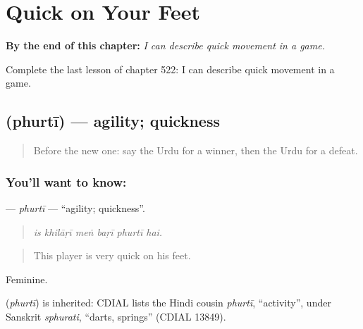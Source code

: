 
\chapter{Quick on Your Feet}
\label{ch:ur-quick-on-your-feet}

\begin{chapteropening}
\textbf{By the end of this chapter:} \emph{I can describe quick movement in a game.}

Complete the last lesson of chapter 522: I can describe quick movement in a game.
\end{chapteropening}

\section[\texorpdfstring{\ur{پھرتی} (phurtī)}{پھرتی (phurtī)}]{ (phurtī) — agility; quickness}

\label{lesson:UR-C522-phurti}



\begin{quote}
Before the new one: say the Urdu for a winner, then the Urdu for a defeat.
\end{quote}

\subsection*{You'll want to know: }
\textbf{} — \emph{phurtī} — \textquotedblleft{}agility; quickness\textquotedblright{}.

\begin{quote}
     
\end{quote}

\begin{quote}
\emph{is khilāṛī meṅ baṛī phurtī hai.}
\end{quote}

\begin{quote}
This player is very quick on his feet.
\end{quote}

Feminine.

\begin{cousinweb}
\textbf{} (\emph{phurtī}) is inherited: CDIAL lists the Hindi cousin \emph{phurtī}, \textquotedblleft{}activity\textquotedblright{}, under Sanskrit \emph{sphurati}, \textquotedblleft{}darts, springs\textquotedblright{} (CDIAL 13849).
\end{cousinweb}


